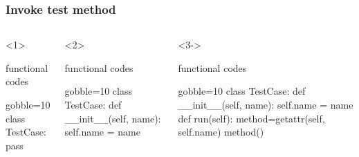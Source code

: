 \documentclass[lualatex]{beamer}
\begin{document}
\begin{frame}[fragile,t]
  \frametitle{Invoke test method}

  \begin{columns}[t]
    \small
    \begin{onlyenv}<1>
      \begin{block}{functional codes}
        \begin{pythoncode*}{gobble=10}
          class TestCase:
            pass
        \end{pythoncode*}
      \end{block}
    \end{onlyenv}
    \begin{onlyenv}<2>
      \begin{block}{functional codes}
        \begin{pythoncode*}{gobble=10}
          class TestCase:
            def __init__(self, name):
              self.name = name
        \end{pythoncode*}
      \end{block}
    \end{onlyenv}
    \begin{onlyenv}<3->
      \begin{block}{functional codes}
        \begin{pythoncode*}{gobble=10}
          class TestCase:
            def __init__(self, name):
              self.name = name
            def run(self):
              method=getattr(self, self.name)
              method()
        \end{pythoncode*}
      \end{block}
    \end{onlyenv}


\end{columns}
\end{frame}
\end{document}
